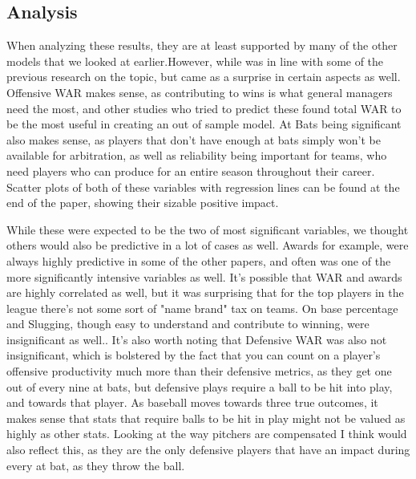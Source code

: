 \documentclass{article}
\begin{document}
\subsection{Analysis}
When analyzing these results, they are at least supported by many of the other models that we looked at earlier.However, while was in line with some of the previous research on the topic, but came as a surprise in certain aspects as well. Offensive WAR makes sense, as contributing to wins is what general managers need the most, and other studies who tried to predict these found total WAR to be the most useful in creating an out of sample model. At Bats being significant also makes sense, as players that don't have enough at bats simply won't be available for arbitration, as well as reliability being important for teams, who need players who can produce for an entire season throughout their career. Scatter plots of both of these variables with regression lines can be found at the end of the paper, showing their sizable positive impact.


While these were expected to be the two of most significant variables, we thought others would also be predictive in a lot of cases as well. Awards for example, were always highly predictive in some of the other papers, and often was one of the more significantly intensive variables as well. It's possible that WAR and awards are highly correlated as well, but it was surprising that for the top players in the league there's not some sort of "name brand" tax on teams. On base percentage and  Slugging, though easy to understand and contribute to winning, were insignificant as well.. It's also worth noting that Defensive WAR was also not insignificant, which is bolstered by the fact that you can count on a player's offensive productivity much more than their defensive metrics, as they get one out of every nine at bats, but defensive plays require a ball to be hit into play, and towards that player. As baseball moves towards three true outcomes, it makes sense that stats that require balls to be hit in play might not be valued as highly as other stats. Looking at the way pitchers are compensated I think would also reflect this, as they are the only defensive players that have an impact during every at bat, as they throw the ball.
\end{document}
